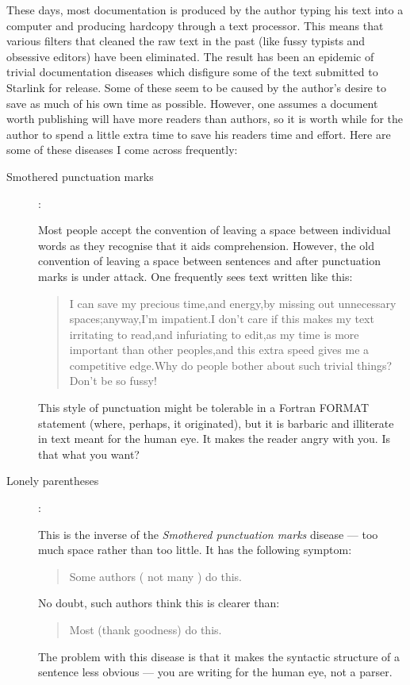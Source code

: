 These days, most documentation is produced by the author typing his text into
a computer and producing hardcopy through a text processor.
This means that various filters that cleaned the raw text in the past (like
fussy typists and obsessive editors) have been eliminated.
The result has been an epidemic of trivial documentation diseases which
disfigure some of the text submitted to Starlink for release.
Some of these seem to be caused by the author's desire to save as much
of his own time as possible.
However, one assumes a document worth publishing will have more readers
than authors, so it is worth while for the author to spend a little extra
time to save his readers time and effort.
Here are some of these diseases I come across frequently:

\begin{description}

\item [Smothered punctuation marks] :

Most people accept the convention of leaving a space between individual words
as they recognise that it aids comprehension.
However, the old convention of leaving a space between sentences and after
punctuation marks is under attack.
One frequently sees text written like this:
\begin{quote}
I can save my precious time,and energy,by missing out unnecessary
spaces;anyway,I'm impatient.I don't care if this makes my text
irritating to read,and infuriating to edit,as my time is more important than
other peoples,and this extra speed gives me a competitive edge.Why do people
bother about such trivial things?Don't be so fussy!
\end{quote}
This style of punctuation might be tolerable in a Fortran FORMAT statement
(where, perhaps, it originated), but it is barbaric and illiterate in text
meant for the human eye.
It makes the reader angry with you.
Is that what you want?

\item [Lonely parentheses] :

This is the inverse of the {\em Smothered punctuation marks} disease\/ ---
too much space rather than too little.
It has the following symptom:
\begin{quote}
Some authors ( not many ) do this.
\end{quote}
No doubt, such authors think this is clearer than:
\begin{quote}
Most (thank goodness) do this.
\end{quote}
The problem with this disease is that it makes the syntactic structure of a
sentence less obvious --- you are writing for the human eye, not a parser.


\end{description}
